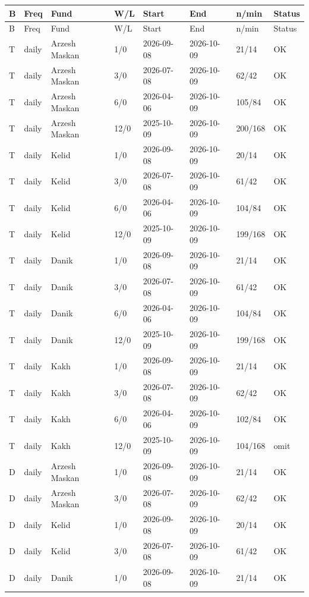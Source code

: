 \documentclass[11pt,a4paper]{article}
\begin{document}
\begingroup\scriptsize\setlength{\tabcolsep}{3pt}
\begin{longtable}{llllllll}
\toprule B & Freq & Fund & W/L & Start & End & n/min & Status \\ \midrule\endfirsthead
\toprule B & Freq & Fund & W/L & Start & End & n/min & Status \\ \midrule\endhead
T & daily & Arzesh Maskan & 1/0 & 2026-09-08 & 2026-10-09 & 21/14 & OK \\
T & daily & Arzesh Maskan & 3/0 & 2026-07-08 & 2026-10-09 & 62/42 & OK \\
T & daily & Arzesh Maskan & 6/0 & 2026-04-06 & 2026-10-09 & 105/84 & OK \\
T & daily & Arzesh Maskan & 12/0 & 2025-10-09 & 2026-10-09 & 200/168 & OK \\
T & daily & Kelid & 1/0 & 2026-09-08 & 2026-10-09 & 20/14 & OK \\
T & daily & Kelid & 3/0 & 2026-07-08 & 2026-10-09 & 61/42 & OK \\
T & daily & Kelid & 6/0 & 2026-04-06 & 2026-10-09 & 104/84 & OK \\
T & daily & Kelid & 12/0 & 2025-10-09 & 2026-10-09 & 199/168 & OK \\
T & daily & Danik & 1/0 & 2026-09-08 & 2026-10-09 & 21/14 & OK \\
T & daily & Danik & 3/0 & 2026-07-08 & 2026-10-09 & 61/42 & OK \\
T & daily & Danik & 6/0 & 2026-04-06 & 2026-10-09 & 104/84 & OK \\
T & daily & Danik & 12/0 & 2025-10-09 & 2026-10-09 & 199/168 & OK \\
T & daily & Kakh & 1/0 & 2026-09-08 & 2026-10-09 & 21/14 & OK \\
T & daily & Kakh & 3/0 & 2026-07-08 & 2026-10-09 & 62/42 & OK \\
T & daily & Kakh & 6/0 & 2026-04-06 & 2026-10-09 & 102/84 & OK \\
T & daily & Kakh & 12/0 & 2025-10-09 & 2026-10-09 & 104/168 & omit \\
D & daily & Arzesh Maskan & 1/0 & 2026-09-08 & 2026-10-09 & 21/14 & OK \\
D & daily & Arzesh Maskan & 3/0 & 2026-07-08 & 2026-10-09 & 62/42 & OK \\
D & daily & Kelid & 1/0 & 2026-09-08 & 2026-10-09 & 20/14 & OK \\
D & daily & Kelid & 3/0 & 2026-07-08 & 2026-10-09 & 61/42 & OK \\
D & daily & Danik & 1/0 & 2026-09-08 & 2026-10-09 & 21/14 & OK \\

\end{longtable}
\end{document}
